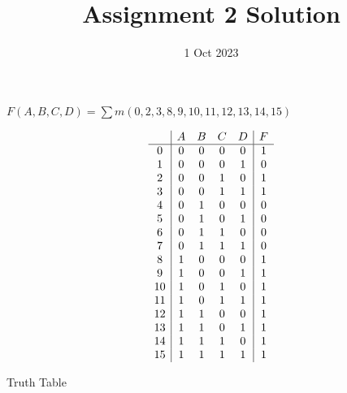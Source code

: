 \documentclass{vhdl-assignment}
\title{Assignment 2 Solution}
\date{1 Oct 2023}
\begin{document}
\maketitle

\begin{problem}{}
    $F(A,B,C,D)=\sum m(0,2,3,8,9,10,11,12,13,14,15)$
    
    \begin{table}[H]
        \centering
        \begin{displaymath}
            \begin{array}{c|c c c c|c}
                  & A & B & C & D & F \\
                \hline
                0  & 0 & 0 & 0 & 0 & 1 \\
                1  & 0 & 0 & 0 & 1 & 0 \\
                2  & 0 & 0 & 1 & 0 & 1 \\
                3  & 0 & 0 & 1 & 1 & 1 \\
                4  & 0 & 1 & 0 & 0 & 0 \\
                5  & 0 & 1 & 0 & 1 & 0 \\
                6  & 0 & 1 & 1 & 0 & 0 \\
                7  & 0 & 1 & 1 & 1 & 0 \\
                8  & 1 & 0 & 0 & 0 & 1 \\
                9  & 1 & 0 & 0 & 1 & 1 \\
                10 & 1 & 0 & 1 & 0 & 1 \\
                11 & 1 & 0 & 1 & 1 & 1 \\
                12 & 1 & 1 & 0 & 0 & 1 \\
                13 & 1 & 1 & 0 & 1 & 1 \\
                14 & 1 & 1 & 1 & 0 & 1 \\
                15 & 1 & 1 & 1 & 1 & 1 \\
            \end{array}
        \end{displaymath}
        \caption[short]{Truth Table}
    \end{table}
    

\end{problem}
\end{document}
